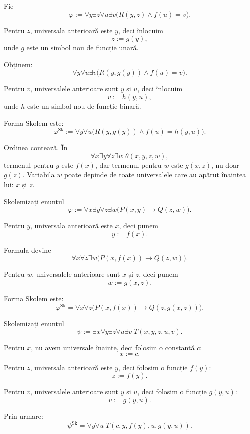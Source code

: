 \begin{eg}
	Fie
	\[
		\varphi := \forall y \exists z \forall u \exists v \big(R(y,z)\land f(u)=v\big).
	\]

	Pentru \(z\), universala anterioară este \(y\), deci înlocuim
	\[
		z := g(y),
	\]
	unde \(g\) este un simbol nou de funcție unară.

	Obținem:
	\[
		\forall y\forall u\exists v \big(R(y,g(y))\land f(u)=v\big).
	\]

	Pentru \(v\), universalele anterioare sunt \(y\) și \(u\), deci înlocuim
	\[
		v := h(y,u),
	\]
	unde \(h\) este un simbol nou de funcție binară.

	Forma Skolem este:
	\[
		\varphi^{\mathrm{Sk}}
		:=
		\forall y\forall u \big(R(y,g(y))\land f(u)=h(y,u)\big).
	\]
\end{eg}

\begin{note}
	Ordinea contează. În
	\[
		\forall x\exists y\forall z\exists w \; \theta(x,y,z,w),
	\]
	termenul pentru \(y\) este \(f(x)\), dar termenul pentru \(w\) este \(g(x,z)\), nu doar \(g(z)\). Variabila \(w\) poate depinde de toate universalele care au apărut înaintea lui: \(x\) și \(z\).
\end{note}

\begin{ex}
	Skolemizați enunțul
	\[
		\varphi := \forall x\exists y\forall z\exists w \big(P(x,y)\to Q(z,w)\big).
	\]
\end{ex}

\begin{solutie}
	Pentru \(y\), universala anterioară este \(x\), deci punem
	\[
		y := f(x).
	\]

	Formula devine
	\[
		\forall x\forall z\exists w \big(P(x,f(x))\to Q(z,w)\big).
	\]

	Pentru \(w\), universalele anterioare sunt \(x\) și \(z\), deci punem
	\[
		w := g(x,z).
	\]

	Forma Skolem este:
	\[
		\varphi^{\mathrm{Sk}}
		=
		\forall x\forall z \big(P(x,f(x))\to Q(z,g(x,z))\big).
	\]
\end{solutie}

\begin{ex}
	Skolemizați enunțul
	\[
		\psi := \exists x\forall y\exists z\forall u\exists v \; T(x,y,z,u,v).
	\]
\end{ex}

\begin{solutie}
	Pentru \(x\), nu avem universale înainte, deci folosim o constantă \(c\):
	\[
		x := c.
	\]

	Pentru \(z\), universala anterioară este \(y\), deci folosim o funcție \(f(y)\):
	\[
		z := f(y).
	\]

	Pentru \(v\), universalele anterioare sunt \(y\) și \(u\), deci folosim o funcție \(g(y,u)\):
	\[
		v := g(y,u).
	\]

	Prin urmare:
	\[
		\psi^{\mathrm{Sk}}
		=
		\forall y\forall u \; T(c,y,f(y),u,g(y,u)).
	\]
\end{solutie}

